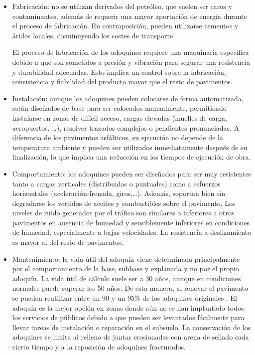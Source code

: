 \begin{itemize}
\item Fabricación: no se utilizan derivados del petróleo, que suelen ser caros y contaminantes, además de requerir una mayor aportación de energía durante el proceso de fabricación. En contraposición, pueden utilizarse cementos y áridos locales, disminuyendo los costes de transporte.

El proceso de fabricación de los adoquines requiere una maquinaria específica debido a que son sometidos a presión y vibración para segurar una resistencia y durabilidad adecuadas. Esto implica un control sobre la fabricación, consistencia y fiabilidad del producto mayor que el resto de pavimentos.

\item Instalación: aunque los adoquines pueden colocarse de forma automatizada, están diseñados de base para ser colocados manualmente, permitiendo instalarse en zonas de difícil acceso, cargas elevadas (muelles de carga, aeropuertos, \ldots), resolver trazados complejos o pendientes pronunciadas. A diferencia de los pavimentos asfálticos, su ejecución no depende de la temperatura ambiente y pueden ser utilizados inmediatamente después de su finalización, lo que implica una reducción en los tiempos de ejecución de obra.

\item Comportamiento: los adoquines pueden ser diseñados para ser muy resistentes tanto a cargas verticales (distribuidas o puntuales) como a esfuerzos horizontales (aceleración-frenada, giros,\ldots). Además, soportan bien sin degradarse los vertidos de aceites y combustibles sobre el pavimento. Los niveles de ruido generados por el tráfico son similares o inferiores a otros pavimentos en ausencia de humedad y sensiblemente inferiores en condiciones de humedad, especialmente a bajas velocidades. La resistencia a deslizamiento es mayor al del resto de pavimentos.

\item Mantenimiento: la vida útil del adoquín viene determinada principalmente por el comportamiento de la base, subbase y explanada y no por el propio adoquín. La vida útil de cálculo suele ser a 30 años, aunque en condiciones normales puede superar los 50 años. De esta manera, al renovar el pavimento se pueden reutilizar entre un 90 y un 95\% de los adoquines originales \cite{eadmt04}. El adoquín es la mejor opción en zonas donde aún no se han implantado todos los servicios de públicos debido a que pueden ser levantados fácilmente para llevar tareas de instalación o reparación en el subsuelo. La conservación de los adoquines se limita al relleno de juntas erosionadas con arena de sellado cada cierto tiempo y a la reposición de adoquines fracturados.


\end{itemize}
